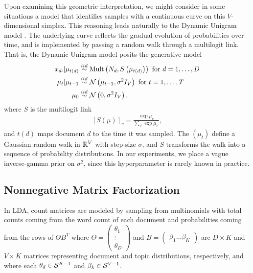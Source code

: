 \documentclass[oupdraft]{bio}
\begin{document}
Upon examining this geometric interpretation, we might consider in some
situations a model that identifies samples with a continuous curve on this
$V$-dimensional simplex. This reasoning leads naturally to the Dynamic
Unigram model \citep{blei2006dynamic}. The underlying curve reflects the gradual evolution
of probabilities over time, and is implemented by passing a random walk through
a multilogit link. That is, the Dynamic Unigram model posits the generative
model
\begin{align*}
x_{d\cdot} \vert \mu_{t\left(d\right)}  &\overset{iid}{\sim} \textnormal{Mult}\left(N_{d}, S\left(\mu_{t\left(d\right)}\right)\right) \text{ for } d = 1, \dots, D\\
\mu_{t} \vert \mu_{t - 1} &\overset{iid}{\sim} \mathcal{N}\left(\mu_{t - 1}, \sigma^{2}I_{V}\right) \text{ for } t = 1, \dots, T \\
\mu_{0} &\overset{iid}{\sim} \mathcal{N}\left(0, \sigma^{2}I_{V}\right),
\end{align*}
where $S$ is the multilogit link
\begin{align*}
\left[S\left(\mu\right)\right]_{v} = \frac{\exp{\mu_{v}}}{\sum_{v^{\prime}} \exp{\mu_{v^{\prime}}}},
\end{align*}
and $t\left(d\right)$ maps document $d$ to the time it was sampled. The
$\left(\mu_{t}\right)$ define a Gaussian random walk in $\mathbb{R}^{V}$ with
step-size $\sigma$, and $S$ transforms the walk into a sequence of probability
distributions. In our experiments, we place a vague inverse-gamma prior on
$\sigma^{2}$, since this hyperparameter is rarely known in practice.

\subsection{Nonnegative Matrix Factorization}
\label{sec:nmf}

In LDA, count matrices are modeled by sampling from multinomials with total
counts coming from the word count of each document and probabilities
coming from the rows of $\Theta B^{T}$ where $\Theta = \begin{pmatrix}\theta_{1}
  \\ \vdots \\ \theta_{D} \end{pmatrix}$ and $B = \begin{pmatrix} \beta_{1}
  \dots \beta_{K} \end{pmatrix}$ are $D \times K$ and $V \times K$ matrices
representing document and topic distributions, respectively, and where each
$\theta_{d} \in \mathcal{S}^{K - 1}$ and $\beta_{k} \in \mathcal{S}^{V - 1}$.
\end{document}
